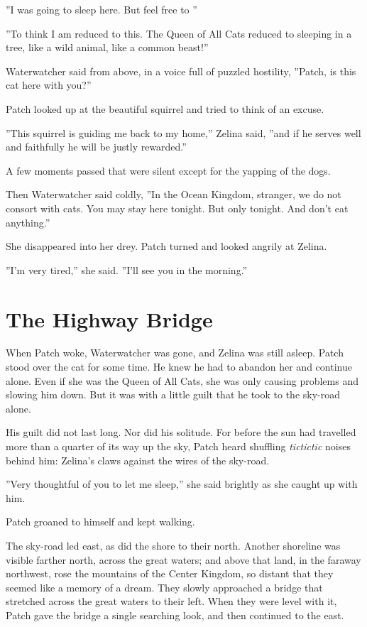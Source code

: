 \documentclass[12pt]{book}
\begin{document}
''I was going to sleep here. But feel free to%
''

''To think I am reduced to this. The Queen of All Cats reduced to sleeping in a tree, like a wild animal, like a common beast!''

Waterwatcher said from above, in a voice full of puzzled hostility, ''Patch, is this cat here with you?''

Patch looked up at the beautiful squirrel and tried to think of an excuse.

''This squirrel is guiding me back to my home,'' Zelina said, ''and if he serves well and faithfully he will be justly rewarded.''

A few moments passed that were silent except for the yapping of the dogs.

Then Waterwatcher said coldly, ''In the Ocean Kingdom, stranger, we do not consort with cats. You may stay here tonight. But only tonight. And don't eat anything.''

She disappeared into her drey. Patch turned and looked angrily at Zelina.

''I'm very tired,'' she said. ''I'll see you in the morning.''


\section{The Highway Bridge}

When Patch woke, Waterwatcher was gone, and Zelina was still asleep. Patch stood over the cat for some time. He knew he had to abandon her and continue alone. Even if she was the Queen of All Cats, she was only causing problems and slowing him down. But it was with a little guilt that he took to the sky-road alone.

His guilt did not last long. Nor did his solitude. For before the sun had travelled more than a quarter of its way up the sky, Patch heard shuffling {\it tictictic} noises behind him: Zelina's claws against the wires of the sky-road.

''Very thoughtful of you to let me sleep,'' she said brightly as she caught up with him.

Patch groaned to himself and kept walking.

The sky-road led east, as did the shore to their north. Another shoreline was visible farther north, across the great waters; and above that land, in the faraway northwest, rose the mountains of the Center Kingdom, so distant that they seemed like a memory of a dream. They slowly approached a bridge that stretched across the great waters to their left. When they were level with it, Patch gave the bridge a single searching look, and then continued to the east.
\end{document}
